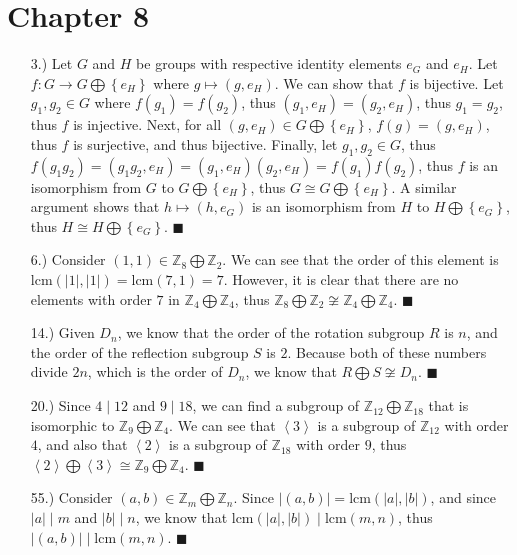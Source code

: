 \documentclass[11pt]{article}
\newcommand{\angleb}[1]{\left\langle#1\right\rangle} %
\newcommand{\vertb}[1]{\left\vert#1\right\vert}      %
\newcommand{\braces}[1]{\left\{#1\right\}}           %
\newcommand{\Z}{\mathbb{Z}}
\begin{document}
\pagestyle{fancy}
\fancyhead{}

\normalsize

\section*{Chapter 8}
\begin{itemize}
    \item [3.)] Let $G$ and $H$ be groups with respective identity elements $e_G$ and $e_H$. Let $f:G\to G\bigoplus\braces{e_H}$ where $g\mapsto(g,e_H)$. We can show that $f$ is bijective. Let $g_1,g_2\in G$ where $f(g_1)=f(g_2)$, thus $(g_1,e_H)=(g_2,e_H)$, thus $g_1=g_2$, thus $f$ is injective. Next, for all $(g,e_H)\in G\bigoplus\braces{e_H}$, $f(g)=(g,e_H)$, thus $f$ is surjective, and thus bijective. Finally, let $g_1,g_2\in G$, thus $f(g_1g_2)=(g_1g_2,e_H)=(g_1,e_H)(g_2,e_H)=f(g_1)f(g_2)$, thus $f$ is an isomorphism from $G$ to $G\bigoplus\braces{e_H}$, thus $G\cong G\bigoplus\braces{e_H}$. A similar argument shows that $h\mapsto(h,e_G)$ is an isomorphism from $H$ to $H\bigoplus\braces{e_G}$, thus $H\cong H\bigoplus\braces{e_G}$. $\blacksquare$

    \item [6.)] Consider $(1,1)\in\Z_8\bigoplus\Z_2$. We can see that the order of this element is $\text{lcm}(\vertb{1},\vertb{1})=\text{lcm}(7,1)=7$. However, it is clear that there are no elements with order $7$ in $\Z_4\bigoplus\Z_4$, thus $\Z_8\bigoplus \Z_2\not\cong\Z_4\bigoplus\Z_4$. $\blacksquare$

    \item [14.)] Given $D_n$, we know that the order of the rotation subgroup $R$ is $n$, and the order of the reflection subgroup $S$ is $2$. Because both of these numbers divide $2n$, which is the order of $D_n$, we know that $R\bigoplus S\not\cong D_n$. $\blacksquare$

    \item [20.)] Since $4\mid12$ and $9\mid18$, we can find a subgroup of $\Z_{12}\bigoplus\Z_{18}$ that is isomorphic to $\Z_9\bigoplus\Z_4$. We can see that $\angleb{3}$ is a subgroup of $\Z_{12}$ with order $4$, and also that $\angleb{2}$ is a subgroup of $\Z_{18}$ with order $9$, thus $\angleb{2}\bigoplus\angleb{3}\cong\Z_9\bigoplus\Z_4$. $\blacksquare$

    \item [55.)] Consider $(a,b)\in\Z_m\bigoplus\Z_n$. Since $\vertb{(a,b)}=\text{lcm}(\vertb{a},\vertb{b})$, and since $\vertb{a}\mid m$ and $\vertb{b}\mid n$, we know that $\text{lcm}(\vertb{a},\vertb{b})\mid\text{lcm}(m,n)$, thus $\vertb{(a,b)}\mid\text{lcm}(m,n)$. $\blacksquare$
\end{itemize}
\end{document}
